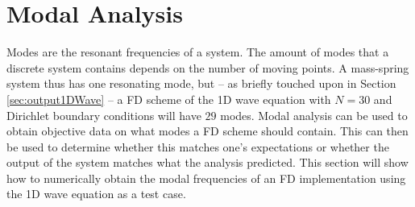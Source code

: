{{\section{Modal Analysis}
\label{sec:modalAnalysis}
Modes are the resonant frequencies of a system. The amount of modes that a discrete system contains depends on the number of moving points. A mass-spring system thus has one resonating mode, but -- as briefly touched upon in Section \ref{sec:output1DWave} -- a FD scheme of the 1D wave equation with $N = 30$ and Dirichlet boundary conditions will have $29$ modes. Modal analysis  can be used to obtain objective data on what modes a FD scheme should contain. This can then be used to determine whether this matches one's expectations or whether the output of the system matches what the analysis predicted. This section will show how to numerically obtain the modal frequencies of an FD implementation using the 1D wave equation as a test case.

}}
